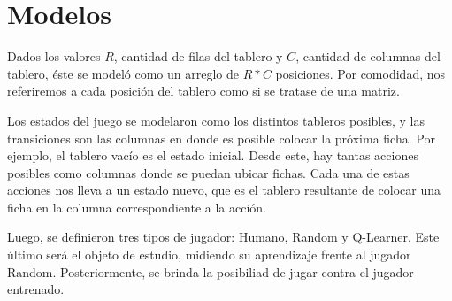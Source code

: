 \section{Modelos}
Dados los valores $R$, cantidad de filas del tablero y $C$, cantidad de columnas del tablero, \'este se model\'o como un arreglo de $R * C$ posiciones. Por comodidad, nos referiremos a cada posici\'on del tablero como si se tratase de una matriz.

Los estados del juego se modelaron como los distintos tableros posibles, y las transiciones son las columnas en donde es posible colocar la pr\'oxima ficha. Por ejemplo, el tablero vacío es el estado inicial. Desde este, hay tantas acciones posibles como columnas donde se puedan ubicar fichas. Cada una de estas acciones nos lleva a un estado nuevo, que es el tablero resultante de colocar una ficha en la columna correspondiente a la acción.

Luego, se definieron tres tipos de jugador: Humano, Random y Q-Learner. Este \'ultimo ser\'a el objeto de estudio, midiendo su aprendizaje frente al jugador Random. 
Posteriormente, se brinda la posibiliad de jugar contra el jugador entrenado.
